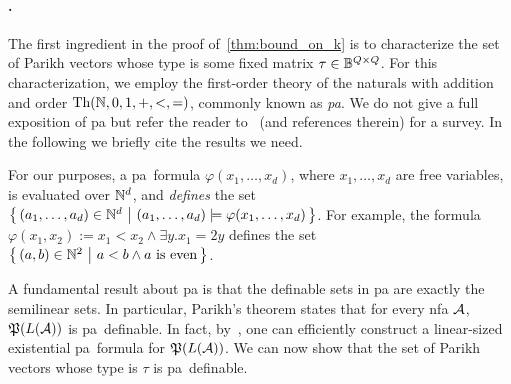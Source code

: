\paragraph*{.}
The first ingredient in the proof of~\cref{thm:bound_on_k} is to characterize the set of Parikh vectors whose type is some fixed matrix $\tau\in \mathbb{B}^{Q\times Q}$. For this characterization, we employ the first-order theory of the naturals with addition and order $\textrm{Th}(\mathbb{N},0,1,+,<,=)$, commonly known as \emph{\gls{pa}}. We do not give a full exposition of \gls{pa} but refer the reader to~\cite{Haase2018} (and references therein) for a survey. In the following we briefly cite the results we need.

For our purposes, a \gls{pa}~formula $\varphi(x_1,\ldots,x_d)$, where $x_1,\ldots, x_d$ are free variables, is evaluated over $\mathbb{N}^d$, and \emph{defines} the set $\left\{\,(a_1,\ldots,a_d)\in \mathbb{N}^d\ \middle|\ (a_1,\ldots,a_d)\models \varphi(x_1,\ldots,x_d)\,\right\}$. For example, the formula $\varphi(x_1,x_2):=x_1< x_2\wedge \exists y. x_1=2y$ defines the set $\left\{\,(a,b)\in \mathbb{N}^2\ \middle|\ a<b\wedge a \text{ is even}\,\right\}$.

A fundamental result about \gls{pa} is that the definable sets in \gls{pa} are exactly the semilinear sets. In particular, Parikh's theorem states that for every \gls{nfa} $\mathcal{A}$, $\mathfrak{P}(L(\mathcal{A}))$ is \gls{pa}~definable. In fact, by~\cite{Verma2005}, one can efficiently construct a linear-sized existential \gls{pa}~formula for $\mathfrak{P}(L(\mathcal{A}))$.
We can now show that the set of Parikh vectors whose type is $\tau$ is \gls{pa}~definable.

